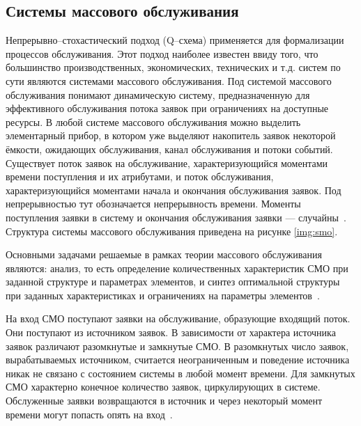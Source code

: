\subsection{Системы массового обслуживания}

Непрерывно--стохастический подход (Q--схема) применяется для формализации процессов обслуживания.  Этот подход наиболее известен ввиду того, что большинство производственных, экономических, технических и т.д. систем по сути являются системами массового обслуживания. Под системой массового обслуживания понимают динамическую систему, предназначенную для эффективного обслуживания потока заявок  при ограничениях на доступные ресурсы. В любой системе массового обслуживания можно выделить элементарный прибор, в котором уже выделяют накопитель заявок некоторой ёмкости, ожидающих обслуживания, канал обслуживания и потоки событий. Существует поток заявок на обслуживание, характеризующийся моментами времени поступления и их атрибутами, и поток обслуживания, характеризующийся моментами начала и окончания обслуживания заявок. Под непрерывностью тут обозначается непрерывность времени. Моменты поступления заявки в систему и окончания обслуживания заявки --- случайны~\cite{sheme_types}. Структура системы массового обслуживания приведена на рисунке \ref{img:smo}.

\FloatBarrier

Основными задачами решаемые в рамках теории массового обслуживания являются: анализ, то есть определение количественных характеристик СМО при заданной структуре и параметрах элементов, и синтез оптимальной структуры при заданных характеристиках и ограничениях на параметры элементов~\cite{ak_det}.

На вход СМО поступают заявки на обслуживание, образующие входящий поток. Они поступают из источником заявок. В зависимости от характера источника заявок различают разомкнутые и замкнутые СМО. В разомкнутых число заявок, вырабатываемых источником, считается неограниченным и поведение источника никак не связано с состоянием системы в любой момент времени. Для замкнутых СМО характерно конечное количество заявок, циркулирующих в системе. Обслуженные заявки возвращаются в источник и через некоторый момент времени могут попасть опять на вход~\cite{ak_det}.

